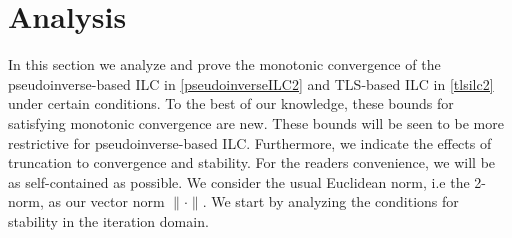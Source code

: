\section{Analysis}\label{analysis}
%
In this section we analyze and prove the monotonic convergence of the pseudoinverse-based ILC in \eqref{pseudoinverseILC2} and TLS-based ILC in \eqref{tlsilc2} under certain conditions. To the best of our knowledge, these bounds for satisfying monotonic convergence are new. These bounds will be seen to be more restrictive for pseudoinverse-based ILC. Furthermore, we indicate the effects of truncation to convergence and stability. For the readers convenience, we will be as self-contained as possible. We consider the usual Euclidean norm, i.e the 2-norm, as our vector norm $\|\cdot\|$. We start by analyzing the conditions for stability in the iteration domain. 

